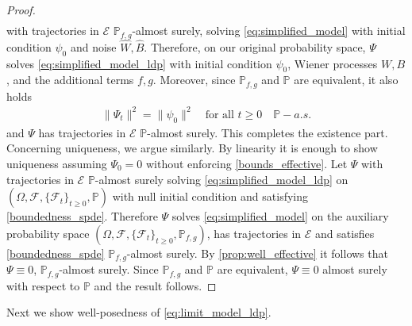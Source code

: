 \documentclass[a4paper,10pt]{amsart}
\newcommand{\PP}{\mathbb{P}}
\newtheorem{proposition}[theorem]{Proposition}
\theoremstyle{remark}
\numberwithin{equation}{section}
\begin{document}
\begin{proof}
\begin{align*}
    \end{align*}
   with trajectories in $\mathcal{E}$ $\PP_{f,g}$-almost surely, solving
   \eqref{eq:simplified_model} with initial condition $\psi_0$ and noise
   $\hat{W},\hat{B}$. Therefore, on our original probability space, $\Psi$
   solves \eqref{eq:simplified_model_ldp} with initial condition $\psi_0$,
   Wiener processes $W,B$, and the additional terms $f,g$. Moreover, since
   $\mathbb{P}_{f,g}$ and $\mathbb{P}$ are equivalent,
  it also holds
  \begin{align*}
        \|\Psi_t\|^2=\|\psi_0\|^2 \quad \text{for all }t\geq 0\quad  \mathbb{P}-a.s.
    \end{align*}
  and $\Psi$ has trajectories in $\mathcal{E}$ $\PP$-almost surely. This completes the existence part. Concerning uniqueness, we argue similarly. By linearity it is enough to show uniqueness assuming $\Psi_0=0$ without enforcing \eqref{bounds_effective}. Let $\Psi $ with trajectories in $\mathcal{E}$ $\PP$-almost surely solving \eqref{eq:simplified_model_ldp} on $(\Omega,\mathcal{F},\{\mathcal{F}_t\}_{t\geq 0},\mathbb{P})$ with null initial condition and satisfying \eqref{boundedness_spde}. Therefore $\Psi$ solves \eqref{eq:simplified_model} on the auxiliary probability space $(\Omega,\mathcal{F},\{\mathcal{F}_t\}_{t\geq 0},\mathbb{P}_{f,g})$, has trajectories in $\mathcal{E}$ and satisfies \eqref{boundedness_spde} $\PP_{f,g}$-almost surely. By \cref{prop:well_effective} it follows that $\Psi\equiv 0$, $\mathbb{P}_{f,g}$-almost surely. Since $\PP_{f,g}$ and $\PP$ are equivalent, $\Psi\equiv 0$ almost surely with respect to $\mathbb{P}$ and the result follows.
\end{proof}
Next we show well-posedness of \eqref{eq:limit_model_ldp}.
\end{document}
